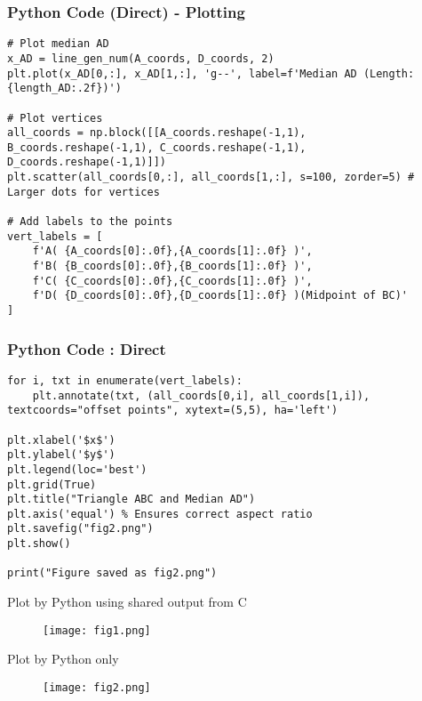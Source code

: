 \documentclass{beamer}
\begin{document}
\begin{frame}[fragile]
\frametitle{Python Code (Direct) - Plotting}
\begin{lstlisting}[style=PythonStyle]
# Plot median AD
x_AD = line_gen_num(A_coords, D_coords, 2)
plt.plot(x_AD[0,:], x_AD[1,:], 'g--', label=f'Median AD (Length: {length_AD:.2f})')

# Plot vertices
all_coords = np.block([[A_coords.reshape(-1,1), B_coords.reshape(-1,1), C_coords.reshape(-1,1), D_coords.reshape(-1,1)]])
plt.scatter(all_coords[0,:], all_coords[1,:], s=100, zorder=5) # Larger dots for vertices

# Add labels to the points
vert_labels = [
    f'A( {A_coords[0]:.0f},{A_coords[1]:.0f} )',
    f'B( {B_coords[0]:.0f},{B_coords[1]:.0f} )',
    f'C( {C_coords[0]:.0f},{C_coords[1]:.0f} )',
    f'D( {D_coords[0]:.0f},{D_coords[1]:.0f} )(Midpoint of BC)'
]
\end{lstlisting}

\end{frame}
\begin{frame}[fragile]
\frametitle{Python Code : Direct}

\begin{lstlisting}
for i, txt in enumerate(vert_labels):
    plt.annotate(txt, (all_coords[0,i], all_coords[1,i]), textcoords="offset points", xytext=(5,5), ha='left')

plt.xlabel('$x$')
plt.ylabel('$y$')
plt.legend(loc='best')
plt.grid(True)
plt.title("Triangle ABC and Median AD")
plt.axis('equal') % Ensures correct aspect ratio
plt.savefig("fig2.png")
plt.show()

print("Figure saved as fig2.png")
\end{lstlisting}
\end{frame}


\begin{frame}{Plot by Python using shared output from C}
\begin{figure}[H]
        \centering
        \texttt{[image: fig1.png]}
        \caption{}
        \label{fig:1}
    \end{figure}
\end{frame}

 \begin{frame}{Plot by Python only}
\begin{figure}[H]
        \centering
        \texttt{[image: fig2.png]}
        \caption{}
        \label{fig:2}
    \end{figure}
\end{frame}

 
\end{document}
